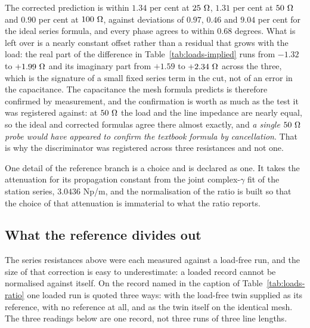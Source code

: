 The corrected prediction is within $1.34$ per cent at $25\ \Omega$, $1.31$ per cent at $50\ \Omega$ and $0.90$ per
cent at $100\ \Omega$, against deviations of $0.97$, $0.46$ and $9.04$ per cent for the ideal series formula, and
every phase agrees to within $0.68$ degrees. What is left over is a nearly constant offset rather than a
residual that grows with the load: the real part of the difference in Table~\ref{tab:loads-implied} runs from
$-1.32$ to $+1.99\ \Omega$ and its imaginary part from $+1.59$ to $+2.34\ \Omega$ across the three, which is the
signature of a small fixed series term in the cut, not of an error in the capacitance. The capacitance the mesh
formula predicts is therefore confirmed by measurement, and the confirmation is worth as much as the test it was
registered against: at $50\ \Omega$ the load and the line impedance are nearly equal, so the ideal and corrected
formulas agree there almost exactly, and \emph{a single $50\ \Omega$ probe would have appeared to confirm the
textbook formula by cancellation}. That is why the discriminator was registered across three resistances and
not one.

One detail of the reference branch is a choice and is declared as one. It takes the attenuation for its
propagation constant from the joint complex-$\gamma$ fit of the station series, $3.0436$ Np/m, and the
normalisation of the ratio is built so that the choice of that attenuation is immaterial to what the ratio
reports.

\subsection{What the reference divides out}
\label{sec:loads-ratio}

The series resistances above were each measured against a load-free run, and the size of that correction is easy
to underestimate: a loaded record cannot be normalised against itself. On the record named in the caption of
Table~\ref{tab:loads-ratio} one loaded run is quoted three ways: with the load-free twin supplied as its reference,
with no reference at all, and as the twin itself on the identical mesh. The three readings below are one record, not
three runs of three line lengths.

